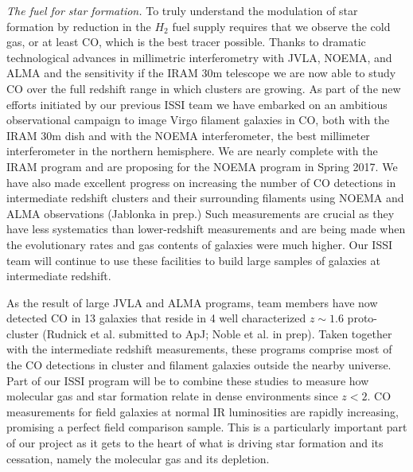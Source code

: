 \documentclass[11pt]{article}
\begin{document}
\textit{The fuel for star formation.} To truly understand the
modulation of star formation by reduction in the $H_2$ fuel supply
requires that we observe the cold gas, or at least CO, which is the best tracer
possible.  Thanks to dramatic technological advances in
millimetric interferometry with JVLA, NOEMA, and ALMA and the sensitivity if the IRAM 30m telescope we are now able
to study CO over the full redshift range in which clusters are
growing.  As part of the new efforts initiated by our previous ISSI team we have embarked on an ambitious observational campaign to image Virgo filament galaxies in CO, both with the IRAM 30m dish and with the NOEMA interferometer, the best millimeter interferometer in the northern hemisphere.  We are nearly complete with the IRAM program and are proposing for the NOEMA program in Spring 2017.  We have also made excellent progress on increasing the number of CO detections in intermediate redshift clusters and their surrounding filaments using NOEMA \citep{Jablonka13} and ALMA observations (Jablonka in prep.)  Such measurements are crucial as they have less systematics than lower-redshift measurements
and are being made when the evolutionary rates and gas contents of
galaxies were much higher.  Our ISSI team will continue to use these facilities to
build large samples of galaxies at intermediate redshift.  

As the result of large JVLA and ALMA programs, team members have now detected CO
in 13 galaxies that reside in 4 well characterized $z\sim 1.6$ proto-cluster
(Rudnick et al. submitted to ApJ; Noble et al. in prep).  Taken together with the intermediate
redshift measurements, these programs comprise most of the CO
detections in cluster and filament galaxies outside the nearby universe.  Part of
our ISSI program will be to combine these studies to measure how
molecular gas and star formation relate in dense environments since
$z<2$.  CO measurements for field galaxies at normal IR luminosities
are rapidly increasing, promising a perfect field comparison sample.
This is a particularly important part of our project as it gets to the
heart of what is driving star formation and its cessation, namely the
molecular gas and its depletion.
\end{document}
